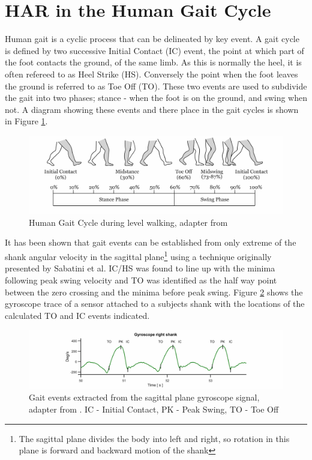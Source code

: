 \documentclass[sensors,article,submit,moreauthors,pdftex]{Definitions/mdpi}
\begin{document}
\section{HAR in the Human Gait Cycle}
\label{sec:human_gait_cycle}
Human gait is a cyclic process that can be delineated by key event. A gait cycle is defined by two successive Initial Contact (IC) event, the point at which part of the foot contacts the ground, of the same limb. As this is normally the heel, it is often refereed to as Heel Strike (HS). Conversely the point when the foot leaves the ground is referred to as Toe Off (TO). These two events are used to subdivide the gait into two phases; stance - when the foot is on the ground, and swing when not. A diagram showing these events and there place in the gait cycles is shown in Figure \ref{fig:gait_cycle}.

\begin{figure}[!htb]
    \centering
    \includegraphics[width=\textwidth]{Figures/Gait_Cycle.jpg}
    \caption{Human Gait Cycle during level walking, adapter from \cite{humanGaitCycle2016}}
    \label{fig:gait_cycle}
\end{figure}

It has been shown that gait events can be established from only extreme of the shank angular velocity in the sagittal plane\footnote{The sagittal plane divides the body into left and right, so rotation in this plane is forward and backward motion of the shank} using a technique originally presented by Sabatini et al\cite{Sabatini2005}. IC/HS was found to line up with the minima following peak swing velocity and TO was identified as the half way point between the zero crossing and the minima before peak swing. Figure \ref{fig:y-gyro-hs-to} shows the gyroscope trace of a sensor attached to a subjects shank with the locations of the calculated TO and IC events indicated.

\begin{figure}[!htb]
    \centering
    \includegraphics[width=\textwidth]{Figures/gyro_trace_hs.jpg}
    \caption{Gait events extracted from the sagittal plane gyroscope signal, adapter from \cite{Sabatini2005}. IC - Initial Contact, PK - Peak Swing, TO - Toe Off}
    \label{fig:y-gyro-hs-to}
\end{figure}
\end{document}
